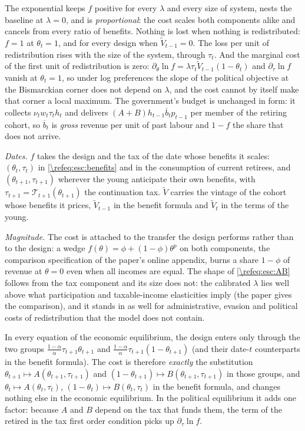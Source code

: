The exponential keeps $f$ positive for every $\lambda$ and every size of system, nests the baseline at $\lambda=0$, and is \emph{proportional}: the cost scales both components alike and cancels from every ratio of benefits. Nothing is lost when nothing is redistributed: $f=1$ at $\theta_t=1$, and for every design when $\tilde{V}_{t-1}=0$. The loss per unit of redistribution rises with the size of the system, through $\tau_t$. And the marginal cost of the first unit of redistribution is zero: $\partial_{\theta}\ln f = \lambda\tau_t\tilde{V}_{t-1}(1-\theta_t)$ and $\partial_{\tau}\ln f$ vanish at $\theta_t=1$, so under log preferences the slope of the political objective at the Bismarckian corner does not depend on $\lambda$, and the cost cannot by itself make that corner a local maximum. The government's budget is unchanged in form: it collects $\nu_t w_t \tau_t h_t$ and delivers $\left(A+B\right)h_{t-1}\overline{b}_tp_{t-1}$ per member of the retiring cohort, so $\overline{b}_t$ is \emph{gross} revenue per unit of past labour and $1-f$ the share that does not arrive.

\emph{Dates.} $f$ takes the design and the tax of the date whose benefits it scales: $(\theta_t,\tau_t)$ in \eqref{\refeq:esc:benefits} and in the consumption of current retirees, and $(\theta_{t+1},\tau_{t+1})$ wherever the young anticipate their own benefits, with $\tau_{t+1} = \mathcal{T}_{t+1}(\theta_{t+1})$ the continuation tax. $\tilde{V}$ carries the vintage of the cohort whose benefits it prices, $\tilde{V}_{t-1}$ in the benefit formula and $\tilde{V}_t$ in the terms of the young.

\emph{Magnitude.} The cost is attached to the transfer the design performs rather than to the design: a wedge $f(\theta) = \phi+(1-\phi)\theta^{p}$ on both components, the comparison specification of the paper's online appendix, burns a share $1-\phi$ of revenue at $\theta = 0$ even when all incomes are equal. The shape of \eqref{\refeq:esc:AB} follows from the tax component and its size does not: the calibrated $\lambda$ lies well above what participation and taxable-income elasticities imply (the paper gives the comparison), and it stands in as well for administrative, evasion and political costs of redistribution that the model does not contain.


\begin{proposition}\label{prop:esc:substitution}
In every equation of the economic equilibrium, the design enters only through the two groups $\frac{1-\alpha}{\alpha}\tau_{t+1}\theta_{t+1}$ and $\frac{1-\alpha}{\alpha}\tau_{t+1}(1-\theta_{t+1})$ (and their date-$t$ counterparts in the benefit formula). The cost is therefore \emph{exactly} the substitution $\theta_{t+1} \mapsto A(\theta_{t+1},\tau_{t+1})$ and $(1-\theta_{t+1})\mapsto B(\theta_{t+1},\tau_{t+1})$ in those groups, and $\theta_t \mapsto A(\theta_t,\tau_t)$, $(1-\theta_t)\mapsto B(\theta_t,\tau_t)$ in the benefit formula, and changes nothing else in the economic equilibrium. In the political equilibrium it adds one factor: because $A$ and $B$ depend on the tax that funds them, the term of the retired in the tax first order condition picks up $\partial_{\tau}\ln f$.
\end{proposition}

